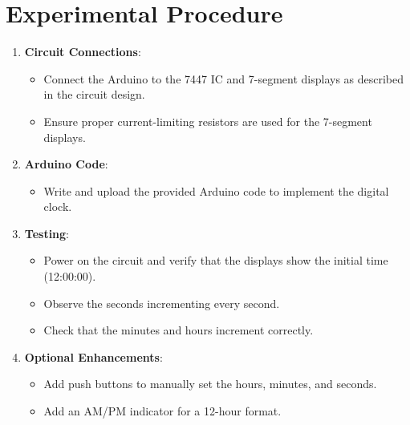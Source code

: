 \documentclass[journal]{IEEEtran}
\begin{document}
\section{Experimental Procedure}
\begin{enumerate}
    \item \textbf{Circuit Connections}:
        \begin{itemize}
            \item Connect the Arduino to the 7447 IC and 7-segment displays as described in the circuit design.
           \item Ensure proper current-limiting resistors are used for the 7-segment displays.
        \end{itemize}
    \item \textbf{Arduino Code}:
        \begin{itemize}
            \item Write and upload the provided Arduino code to implement the digital clock.
        \end{itemize}
    \item \textbf{Testing}:
        \begin{itemize}
            \item Power on the circuit and verify that the displays show the initial time (12:00:00).
            \item Observe the seconds incrementing every second.
            \item Check that the minutes and hours increment correctly.
        \end{itemize}
    \item \textbf{Optional Enhancements}:
        \begin{itemize}
            \item Add push buttons to manually set the hours, minutes, and seconds.
            \item Add an AM/PM indicator for a 12-hour format.
        \end{itemize}
\end{enumerate}
\end{document}
